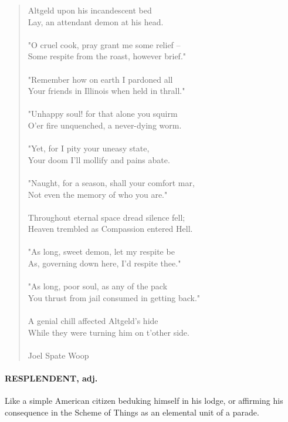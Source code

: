 \documentclass[11pt]{article}
\begin{document}
\begin{quote}   Altgeld upon his incandescent bed \\
  Lay, an attendant demon at his head. \\
 \\
  "O cruel cook, pray grant me some relief -- \\
  Some respite from the roast, however brief." \\
 \\
  "Remember how on earth I pardoned all \\
  Your friends in Illinois when held in thrall." \\
 \\
  "Unhappy soul! for that alone you squirm \\
  O'er fire unquenched, a never-dying worm. \\
 \\
  "Yet, for I pity your uneasy state, \\
  Your doom I'll mollify and pains abate. \\
 \\
  "Naught, for a season, shall your comfort mar, \\
  Not even the memory of who you are." \\
 \\
  Throughout eternal space dread silence fell; \\
  Heaven trembled as Compassion entered Hell. \\
 \\
  "As long, sweet demon, let my respite be \\
  As, governing down here, I'd respite thee." \\
 \\
  "As long, poor soul, as any of the pack \\
  You thrust from jail consumed in getting back." \\
 \\
  A genial chill affected Altgeld's hide \\
  While they were turning him on t'other side. \\
 \\
Joel Spate Woop \end{quote}


\paragraph{RESPLENDENT, adj.}  Like a simple American citizen beduking himself in
his lodge, or affirming his consequence in the Scheme of Things as an
elemental unit of a parade.
\end{document}
